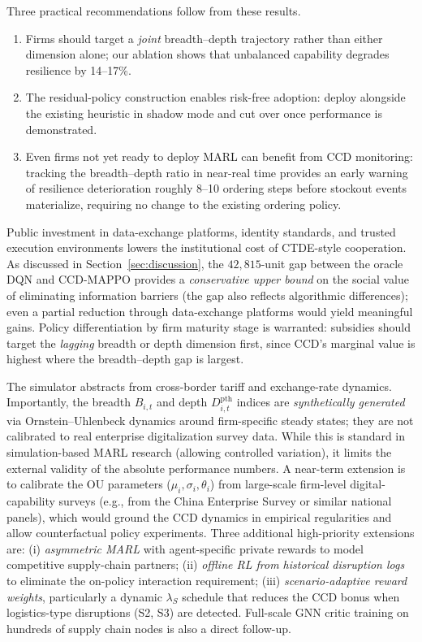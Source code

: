 \documentclass[11pt,a4paper]{article}
\theoremstyle{plain}
\theoremstyle{definition}
\begin{document}
Three practical recommendations follow from these results.
\begin{enumerate}[label=(\arabic*),itemsep=2pt]
  \item Firms should target a \emph{joint} breadth--depth trajectory rather than either
    dimension alone; our ablation shows that unbalanced capability degrades resilience by
    14--17\%.
  \item The residual-policy construction enables risk-free adoption: deploy alongside the
    existing heuristic in shadow mode and cut over once performance is demonstrated.
  \item Even firms not yet ready to deploy MARL can benefit from CCD monitoring: tracking
    the breadth--depth ratio in near-real time provides an early warning of resilience
    deterioration roughly 8--10 ordering steps before stockout events materialize,
    requiring no change to the existing ordering policy.
\end{enumerate}

Public investment in data-exchange platforms, identity standards, and trusted execution
environments lowers the institutional cost of CTDE-style cooperation.  As discussed in
Section~\ref{sec:discussion}, the $42{,}815$-unit gap between the oracle DQN and
CCD-MAPPO provides a \emph{conservative upper bound} on the social value of eliminating
information barriers (the gap also reflects algorithmic differences); even a partial
reduction through data-exchange platforms would yield meaningful gains.  Policy
differentiation by firm maturity stage is warranted: subsidies should target the
\emph{lagging} breadth or depth dimension first, since CCD's marginal value is highest
where the breadth--depth gap is largest.

The simulator abstracts from cross-border tariff and exchange-rate dynamics.
Importantly, the breadth $B_{i,t}$ and depth $D^{\mathrm{pth}}_{i,t}$ indices are
\emph{synthetically generated} via Ornstein--Uhlenbeck dynamics around firm-specific
steady states; they are not calibrated to real enterprise digitalization survey data.
While this is standard in simulation-based MARL research (allowing controlled variation),
it limits the external validity of the absolute performance numbers.  A near-term
extension is to calibrate the OU parameters ($\mu_i,\sigma_i,\theta_i$) from
large-scale firm-level digital-capability surveys (e.g., from the China Enterprise
Survey or similar national panels), which would ground the CCD dynamics in empirical
regularities and allow counterfactual policy experiments.
Three additional high-priority extensions are: (i) \emph{asymmetric MARL} with
agent-specific private rewards to model competitive supply-chain partners; (ii)
\emph{offline RL from historical disruption logs} to eliminate the on-policy interaction
requirement; (iii) \emph{scenario-adaptive reward weights}, particularly a dynamic
$\lambda_S$ schedule that reduces the CCD bonus when logistics-type disruptions (S2,
S3) are detected.  Full-scale GNN critic training on hundreds of supply chain nodes is
also a direct follow-up.
\end{document}
